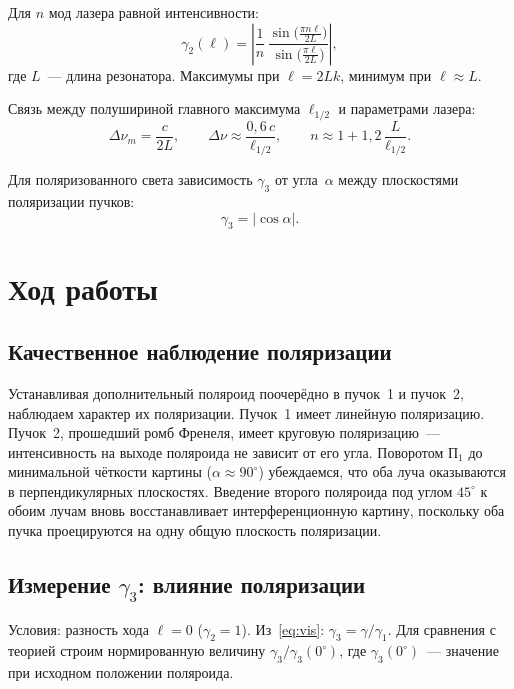 \documentclass[twoside]{mfitjournal}
\begin{document}
Для $n$ мод лазера равной интенсивности:
\begin{equation}\label{eq:V2}
  \gamma_2(\ell) = \left|\frac{1}{n}\,\frac{\sin\!\bigl(\tfrac{\pi n \ell}{2L}\bigr)}
                                             {\sin\!\bigl(\tfrac{\pi \ell}{2L}\bigr)}\right|,
\end{equation}
где $L$~--- длина резонатора. Максимумы при $\ell = 2Lk$, минимум при $\ell \approx L$.

Связь между полушириной главного максимума $\ell_{1/2}$ и параметрами лазера:
\begin{equation}\label{eq:params}
  \Delta\nu_m = \frac{c}{2L}, \qquad
  \Delta\nu \approx \frac{0{,}6\,c}{\ell_{1/2}}, \qquad
  n \approx 1 + 1{,}2\,\frac{L}{\ell_{1/2}}.
\end{equation}

Для поляризованного света зависимость $\gamma_3$ от угла~$\alpha$ между плоскостями поляризации пучков:
\begin{equation}\label{eq:V3}
  \gamma_3 = |\cos\alpha|.
\end{equation}

\section*{Ход работы}

\subsection*{Качественное наблюдение поляризации}

Устанавливая дополнительный поляроид поочерёдно в пучок~1 и пучок~2, наблюдаем характер их поляризации. Пучок~1 имеет линейную поляризацию. Пучок~2, прошедший ромб Френеля, имеет круговую поляризацию~--- интенсивность на выходе поляроида не зависит от его угла. Поворотом П$_1$ до минимальной чёткости картины ($\alpha \approx 90^\circ$) убеждаемся, что оба луча оказываются в перпендикулярных плоскостях. Введение второго поляроида под углом $45^\circ$ к обоим лучам вновь восстанавливает интерференционную картину, поскольку оба пучка проецируются на одну общую плоскость поляризации.

\subsection*{Измерение \texorpdfstring{$\gamma_3$}{gamma3}: влияние поляризации}

Условия: разность хода $\ell = 0$ ($\gamma_2 = 1$). Из~\eqref{eq:vis}:
$\gamma_3 = \gamma/\gamma_1$. Для сравнения с теорией строим нормированную величину $\gamma_3/\gamma_3(0^\circ)$, где $\gamma_3(0^\circ)$~--- значение при исходном положении поляроида.
\end{document}
